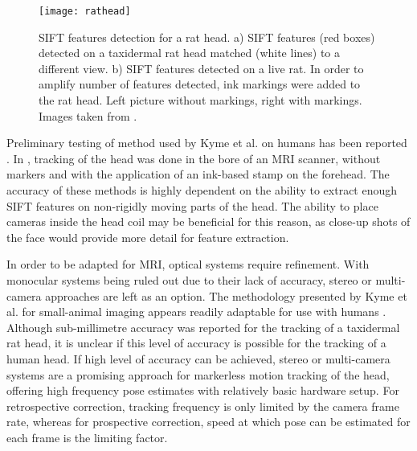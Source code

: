 \documentclass[class=article, crop=false]{standalone}
\begin{document}
\begin{figure}
	\centering
	\texttt{[image: rathead]}
	\caption{SIFT features detection for a rat head. a) SIFT features (red boxes) detected on a taxidermal rat head matched (white lines) to a different view. b) SIFT features detected on a live rat. In order to amplify number of features detected, ink markings were added to the rat head. Left picture without markings, right with markings. Images taken from \parencite{Kyme2014}.}
	\label{rathead}
\end{figure}

\par 
Preliminary testing of method used by Kyme et al. \parencite*{Kyme2014} on humans has been reported \parencite{Kyme2016,Kyme2013}. In \cite{Kyme2016}, tracking of the head was done in the bore of an MRI scanner, without markers and with the application of an ink-based stamp on the forehead. The accuracy of these methods is highly dependent on the ability to extract enough SIFT features on non-rigidly moving parts of the head. The ability to place cameras inside the head coil may be beneficial for this reason, as close-up shots of the face would provide more detail for feature extraction.
\par 
In order to be adapted for MRI, optical systems require refinement. With monocular systems being ruled out due to their lack of accuracy, stereo or multi-camera approaches are left as an option. The methodology presented by Kyme et al. \parencite*{Kyme2014} for small-animal imaging appears readily adaptable for use with humans \parencite{Kyme2016,Kyme2013}. Although sub-millimetre accuracy was reported for the tracking of a taxidermal rat head, it is unclear if this level of accuracy is possible for the tracking of a human head. If high level of accuracy can be achieved, stereo or multi-camera systems are a promising approach for markerless motion tracking of the head, offering high frequency pose estimates with relatively basic hardware setup. For retrospective correction, tracking frequency is only limited by the camera frame rate, whereas for prospective correction, speed at which pose can be estimated for each frame is the limiting factor.
\end{document}
